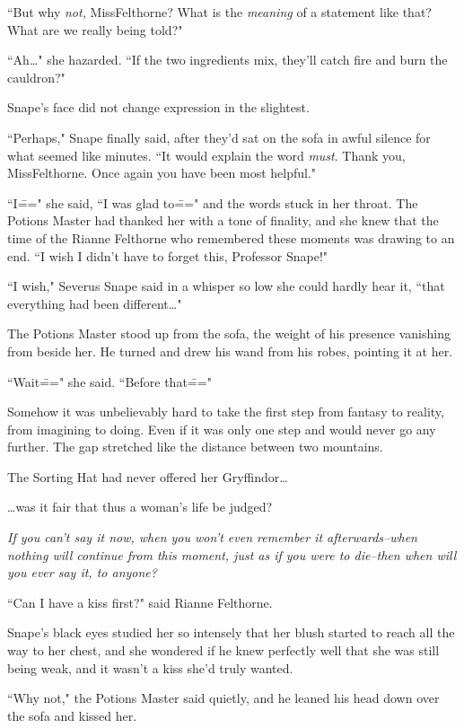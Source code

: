 ``But why \emph{not,} Miss\?Felthorne? What is the \emph{meaning} of a statement like that? What are we really being told?"

``Ah{\ldots}" she hazarded. ``If the two ingredients mix, they'll catch fire and burn the cauldron?"

Snape's face did not change expression in the slightest.

``Perhaps," Snape finally said, after they'd sat on the sofa in awful silence for what seemed like minutes. ``It would explain the word \emph{must}. Thank you, Miss\?Felthorne. Once again you have been most helpful."

``I\===" she said, ``I was glad to\===" and the words stuck in her throat. The Potions Master had thanked her with a tone of finality, and she knew that the time of the Rianne Felthorne who remembered these moments was drawing to an end. ``I wish I didn't have to forget this, Professor Snape!"

``I wish," Severus Snape said in a whisper so low she could hardly hear it, ``that everything had been different{\ldots}"

The Potions Master stood up from the sofa, the weight of his presence vanishing from beside her. He turned and drew his wand from his robes, pointing it at her.

``Wait\===" she said. ``Before that\==="

Somehow it was unbelievably hard to take the first step from fantasy to reality, from imagining to doing. Even if it was only one step and would never go any further. The gap stretched like the distance between two mountains.

The Sorting Hat had never offered her Gryffindor{\ldots}

{\ldots}was it fair that thus a woman's life be judged?

\emph{If you can't say it now, when you won't even remember it afterwards\---when nothing will continue from this moment, just as if you were to die\---then when will you ever say it, to anyone?}

``Can I have a kiss first?" said Rianne Felthorne.

Snape's black eyes studied her so intensely that her blush started to reach all the way to her chest, and she wondered if he knew perfectly well that she was still being weak, and it wasn't a kiss she'd truly wanted.

``Why not," the Potions Master said quietly, and he leaned his head down over the sofa and kissed her.

